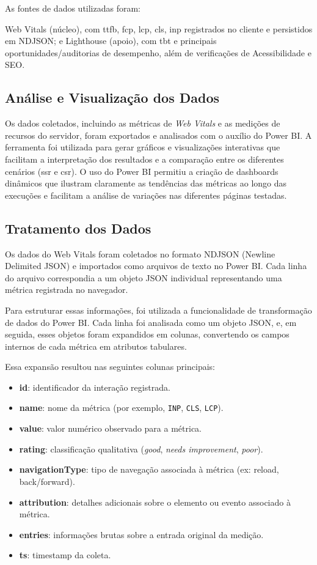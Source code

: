 As fontes de dados utilizadas foram: {Web Vitals (núcleo), com \acrshort{ttfb}, \acrshort{fcp}, \acrshort{lcp}, \acrshort{cls}, \acrshort{inp} registrados no cliente e persistidos em NDJSON; e Lighthouse (apoio), com \acrshort{tbt} e principais oportunidades/auditorias de desempenho, além de verificações de Acessibilidade e SEO.

\subsection{Análise e Visualização dos Dados}
Os dados coletados, incluindo as métricas de \textit{Web Vitals} e as medições de recursos do servidor, foram exportados e analisados com o auxílio do Power BI. A ferramenta foi utilizada para gerar gráficos e visualizações interativas que facilitam a interpretação dos resultados e a comparação entre os diferentes cenários (\acrshort{ssr} e \acrshort{csr}). O uso do Power BI permitiu a criação de dashboards dinâmicos que ilustram claramente as tendências das métricas ao longo das execuções e facilitam a análise de variações nas diferentes páginas testadas.

\subsection{Tratamento dos Dados}
Os dados do Web Vitals foram coletados no formato NDJSON (Newline Delimited JSON) e importados como arquivos de texto no Power BI. Cada linha do arquivo correspondia a um objeto JSON individual representando uma métrica registrada no navegador.

Para estruturar essas informações, foi utilizada a funcionalidade de transformação de dados do Power BI. Cada linha foi analisada como um objeto JSON, e, em seguida, esses objetos foram expandidos em colunas, convertendo os campos internos de cada métrica em atributos tabulares.

Essa expansão resultou nas seguintes colunas principais:

\begin{itemize}
    \item \textbf{id}: identificador da interação registrada.
    \item \textbf{name}: nome da métrica (por exemplo, \texttt{INP}, \texttt{CLS}, \texttt{LCP}).
    \item \textbf{value}: valor numérico observado para a métrica.
    \item \textbf{rating}: classificação qualitativa (\textit{good}, \textit{needs improvement}, \textit{poor}).
    \item \textbf{navigationType}: tipo de navegação associada à métrica (ex: reload, back/forward).
    \item \textbf{attribution}: detalhes adicionais sobre o elemento ou evento associado à métrica.
    \item \textbf{entries}: informações brutas sobre a entrada original da medição.
    \item \textbf{ts}: timestamp da coleta.
\end{itemize}

}
